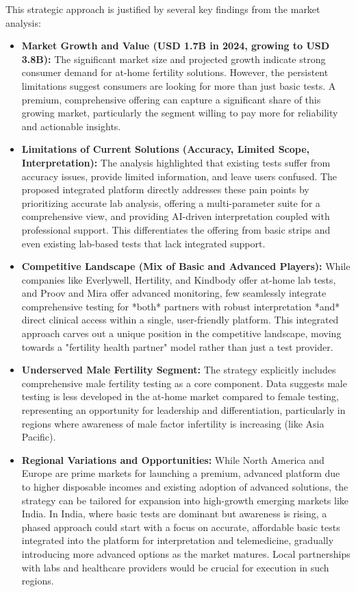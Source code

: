 \documentclass{article}
\begin{document}
This strategic approach is justified by several key findings from the market analysis:

\begin{itemize}
    \item \textbf{Market Growth and Value (USD 1.7B in 2024, growing to USD 3.8B):} The significant market size and projected growth indicate strong consumer demand for at-home fertility solutions. However, the persistent limitations suggest consumers are looking for more than just basic tests. A premium, comprehensive offering can capture a significant share of this growing market, particularly the segment willing to pay more for reliability and actionable insights.
    \item \textbf{Limitations of Current Solutions (Accuracy, Limited Scope, Interpretation):} The analysis highlighted that existing tests suffer from accuracy issues, provide limited information, and leave users confused. The proposed integrated platform directly addresses these pain points by prioritizing accurate lab analysis, offering a multi-parameter suite for a comprehensive view, and providing AI-driven interpretation coupled with professional support. This differentiates the offering from basic strips and even existing lab-based tests that lack integrated support.
    \item \textbf{Competitive Landscape (Mix of Basic and Advanced Players):} While companies like Everlywell, Hertility, and Kindbody offer at-home lab tests, and Proov and Mira offer advanced monitoring, few seamlessly integrate comprehensive testing for *both* partners with robust interpretation *and* direct clinical access within a single, user-friendly platform. This integrated approach carves out a unique position in the competitive landscape, moving towards a "fertility health partner" model rather than just a test provider.
    \item \textbf{Underserved Male Fertility Segment:} The strategy explicitly includes comprehensive male fertility testing as a core component. Data suggests male testing is less developed in the at-home market compared to female testing, representing an opportunity for leadership and differentiation, particularly in regions where awareness of male factor infertility is increasing (like Asia Pacific).
    \item \textbf{Regional Variations and Opportunities:} While North America and Europe are prime markets for launching a premium, advanced platform due to higher disposable incomes and existing adoption of advanced solutions, the strategy can be tailored for expansion into high-growth emerging markets like India. In India, where basic tests are dominant but awareness is rising, a phased approach could start with a focus on accurate, affordable basic tests integrated into the platform for interpretation and telemedicine, gradually introducing more advanced options as the market matures. Local partnerships with labs and healthcare providers would be crucial for execution in such regions.

\end{itemize}
\end{document}

